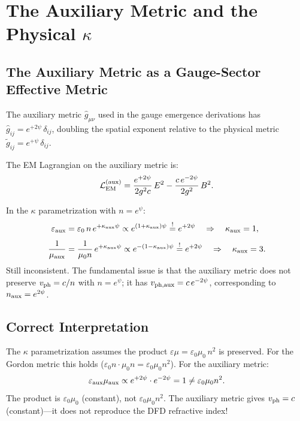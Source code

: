 \documentclass[11pt,a4paper]{article}
\theoremstyle{definition}
\theoremstyle{remark}
\begin{document}
\section{The Auxiliary Metric and the Physical $\kappa$}

\subsection{The Auxiliary Metric as a Gauge-Sector Effective Metric}

The auxiliary metric $\hat{g}_{\mu\nu}$ used in the gauge emergence
derivations has $\hat{g}_{ij} = e^{+2\psi}\,\delta_{ij}$, doubling
the spatial exponent relative to the physical metric
$\tilde{g}_{ij} = e^{+\psi}\,\delta_{ij}$.

The EM Lagrangian on the auxiliary metric is:
\begin{equation}
\mathcal{L}_{\rm EM}^{(\rm aux)} = \frac{e^{+2\psi}}{2g^2 c}\,E^2
- \frac{c\,e^{-2\psi}}{2g^2}\,B^2.
\end{equation}

In the $\kappa$ parametrization with $n = e^\psi$:
\begin{align}
\varepsilon_{\rm aux} &= \varepsilon_0\,n\,e^{+\kappa_{\rm aux}\psi}
\propto e^{(1+\kappa_{\rm aux})\psi}
\stackrel{!}{=} e^{+2\psi}
\quad\Rightarrow\quad \kappa_{\rm aux} = 1, \\[4pt]
\frac{1}{\mu_{\rm aux}}
&= \frac{1}{\mu_0 n}\,e^{+\kappa_{\rm aux}\psi}
\propto e^{-(1-\kappa_{\rm aux})\psi}
\stackrel{!}{=} e^{+2\psi}
\quad\Rightarrow\quad \kappa_{\rm aux} = 3.
\end{align}
Still inconsistent.  The fundamental issue is that the auxiliary metric
does not preserve $v_{\rm ph} = c/n$ with $n = e^\psi$; it has
$v_{\rm ph,aux} = c\,e^{-2\psi}$, corresponding to $n_{\rm aux} = e^{2\psi}$.

\subsection{Correct Interpretation}

The $\kappa$ parametrization assumes the product
$\varepsilon\mu = \varepsilon_0\mu_0\,n^2$ is preserved.  For the
Gordon metric this holds ($\varepsilon_0 n \cdot \mu_0 n = \varepsilon_0\mu_0 n^2$).
For the auxiliary metric:
\begin{equation}
\varepsilon_{\rm aux}\mu_{\rm aux}
\propto e^{+2\psi}\cdot e^{-2\psi} = 1 \neq \varepsilon_0\mu_0 n^2.
\end{equation}
The product is $\varepsilon_0\mu_0$ (constant), not $\varepsilon_0\mu_0 n^2$.
The auxiliary metric gives $v_{\rm ph} = c$ (constant)---it does not
reproduce the DFD refractive index!
\end{document}
